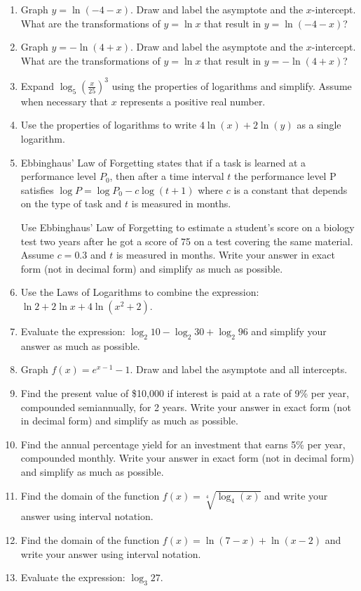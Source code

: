 \documentclass[11pt]{article}
\begin{document}
\begin{enumerate}
\item  Graph $\displaystyle y=\ln(-4-x)$. Draw and label the  asymptote and the $x$-intercept. What are the transformations of $y=\ln x$ that result in $\displaystyle y=\ln(-4-x)$?
\item  Graph $\displaystyle y=-\ln(4+x)$. Draw and label the  asymptote and the $x$-intercept. What are the transformations of $y=\ln x$ that result in $\displaystyle y=-\ln(4+x)$?
\item Expand $\displaystyle \log_5 \left ( \frac{x}{25}\right )^3$ using the properties of logarithms and simplify. Assume when necessary that $x$ represents a positive real number.
\item Use the properties of logarithms to write $\displaystyle 4 \ln(x) + 2 \ln(y)$ as a single logarithm.
\item Ebbinghaus' Law of Forgetting  states that if a task is learned at a performance level $P_0$, then after a time interval $t$ the performance level P satisfies
$\displaystyle \log P = \log P_0 - c \log(t + 1)$
where $c$ is a constant that depends on the type of task and $t$ is measured in months.

Use Ebbinghaus' Law of Forgetting to estimate a student's score on a biology test two years after he got a score of 75 on a test covering the same material. Assume $c = 0.3$ and $t$ is measured in months. Write your answer in exact form (not in decimal form) and simplify as much as possible.
\item Use the Laws of Logarithms to combine the expression:
$\displaystyle \ln 2 + 2 \ln x + 4 \ln(x^2 + 2)$.
\item Evaluate the expression: $\displaystyle \log_2 10 - \log_2 30 + \log_2 96$ and simplify your answer as much as possible.
\item Graph $\displaystyle f(x)=e^{x-1}-1$. Draw and label the asymptote and all intercepts.
\item  Find the present value of \$10,000 if interest is paid at a rate of 9\% per year, compounded semiannually, for 2 years. Write your answer in exact form (not in decimal form) and simplify as much as possible.
\item Find the annual percentage yield for an investment that earns 5\% per year, compounded monthly. Write your answer in exact form (not in decimal form) and simplify as much as possible.
\item Find the domain of the function $\displaystyle f(x) = 
\sqrt[4]{\log_4(x)}$ and write your answer using interval notation. 
\item Find the domain of the function $\displaystyle f(x) = 
\ln(7 - x) + \ln(x - 2)$ and write your answer using interval notation. 
\item Evaluate the expression:
$\displaystyle \log_3 27$.



\end{enumerate}
\end{document}
